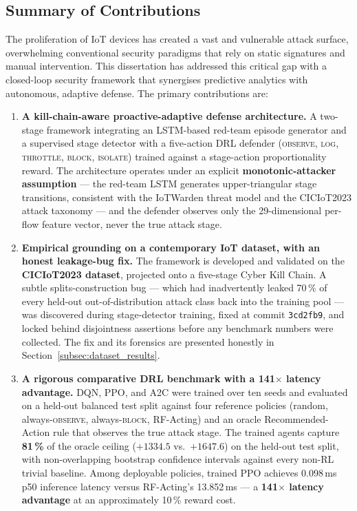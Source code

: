 \subsection{Summary of Contributions}\label{subsec:summary}
The proliferation of IoT devices has created a vast and vulnerable attack surface, overwhelming conventional security paradigms that rely on static signatures and manual intervention. This dissertation has addressed this critical gap with a closed-loop security framework that synergises predictive analytics with autonomous, adaptive defense. The primary contributions are:
\begin{enumerate}
    \item \textbf{A kill-chain-aware proactive-adaptive defense architecture.} A two-stage framework integrating an LSTM-based red-team episode generator and a supervised stage detector with a five-action DRL defender (\textsc{observe}, \textsc{log}, \textsc{throttle}, \textsc{block}, \textsc{isolate}) trained against a stage-action proportionality reward. The architecture operates under an explicit \textbf{monotonic-attacker assumption} --- the red-team LSTM generates upper-triangular stage transitions, consistent with the IoTWarden threat model and the CICIoT2023 attack taxonomy --- and the defender observes only the 29-dimensional per-flow feature vector, never the true attack stage.

    \item \textbf{Empirical grounding on a contemporary IoT dataset, with an honest leakage-bug fix.} The framework is developed and validated on the \textbf{CICIoT2023 dataset}, projected onto a five-stage Cyber Kill Chain. A subtle splits-construction bug --- which had inadvertently leaked 70\,\% of every held-out out-of-distribution attack class back into the training pool --- was discovered during stage-detector training, fixed at commit \texttt{3cd2fb9}, and locked behind disjointness assertions before any benchmark numbers were collected. The fix and its forensics are presented honestly in Section~\ref{subsec:dataset_results}.

    \item \textbf{A rigorous comparative DRL benchmark with a 141$\times$ latency advantage.} DQN, PPO, and A2C were trained over ten seeds and evaluated on a held-out balanced test split against four reference policies (random, always-\textsc{observe}, always-\textsc{block}, RF-Acting) and an oracle Recommended-Action rule that observes the true attack stage. The trained agents capture \textbf{81\,\%} of the oracle ceiling ($+1334.5$ vs.\ $+1647.6$) on the held-out test split, with non-overlapping bootstrap confidence intervals against every non-RL trivial baseline. Among deployable policies, trained PPO achieves 0.098\,ms p50 inference latency versus RF-Acting's 13.852\,ms --- a \textbf{141$\times$ latency advantage} at an approximately 10\,\% reward cost.


\end{enumerate}
